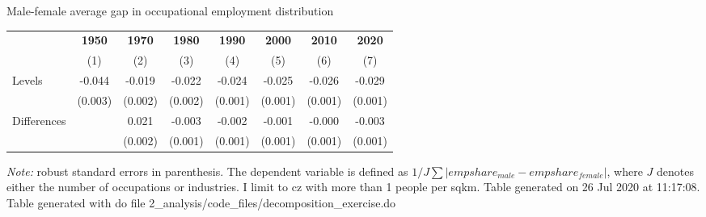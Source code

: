 \begin{center}
\begin{threeparttable}[!h]
\caption{Male-female average gap in occupational employment distribution}
\begin{tabular}{lccccccc}
\toprule
\toprule
&\multicolumn{1}{c}{\textbf{1950}}&\multicolumn{1}{c}{\textbf{1970}}&\multicolumn{1}{c}{\textbf{1980}}&\multicolumn{1}{c}{\textbf{1990}}&\multicolumn{1}{c}{\textbf{2000}}&\multicolumn{1}{c}{\textbf{2010}}&\multicolumn{1}{c}{\textbf{2020}} \\
\textbf{}&\multicolumn{1}{c}{(1)}&\multicolumn{1}{c}{(2)}&\multicolumn{1}{c}{(3)}&\multicolumn{1}{c}{(4)}&\multicolumn{1}{c}{(5)}&\multicolumn{1}{c}{(6)}&\multicolumn{1}{c}{(7)} \\
\midrule
Levels              &      -0.044\sym{***}&      -0.019\sym{***}&      -0.022\sym{***}&      -0.024\sym{***}&      -0.025\sym{***}&      -0.026\sym{***}&      -0.029\sym{***}\\
                    &     (0.003)         &     (0.002)         &     (0.002)         &     (0.001)         &     (0.001)         &     (0.001)         &     (0.001)         \\
Differences         &                     &       0.021\sym{***}&      -0.003\sym{*}  &      -0.002\sym{*}  &      -0.001         &      -0.000         &      -0.003\sym{***}\\
                    &                     &     (0.002)         &     (0.001)         &     (0.001)         &     (0.001)         &     (0.001)         &     (0.001)         \\
\bottomrule
\bottomrule
\end{tabular}
\begin{tablenotes}
\item \footnotesize \textit{Note:} robust standard errors in parenthesis. The dependent variable is defined as $1/J \sum | empshare_{male}- empshare_{female}| $, where $ J $ denotes either the number of occupations or industries. I limit to cz with more than 1 people per sqkm. Table generated on 26 Jul 2020 at 11:17:08. Table generated with do file 2\_analysis/code\_files/decomposition\_exercise.do
\end{tablenotes}
\end{threeparttable}
\end{center}
